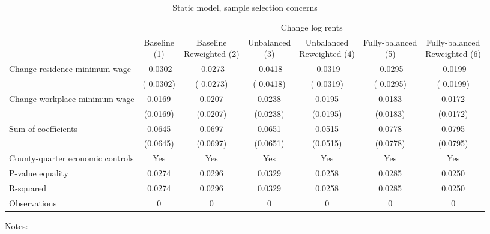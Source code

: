 \begin{table}
    \caption{Static model, sample selection concerns}
    \label{tab:static_sample}

    \begin{tabular}{@{}lcccccc@{}}
        \toprule
                                             & \multicolumn{6}{c}{Change log rents}                                     \\ \cmidrule(l){2-7} 
                                             & \shortstack{Baseline\\(1)}       & \shortstack{Baseline\\Reweighted (2)}
                                             & \shortstack{Unbalanced\\(3)}     & \shortstack{Unbalanced\\Reweighted (4)}
                                             & \shortstack{Fully-balanced\\(5)} & \shortstack{Fully-balanced\\Reweighted (6)}  \\ \midrule
        Change residence minimum wage        & -0.0302      & -0.0273        & -0.0418       & -0.0319      & -0.0295     & -0.0199            \\
                                             & (-0.0302)    & (-0.0273)      & (-0.0418)     & (-0.0319)    & (-0.0295)   & (-0.0199)          \\
        Change workplace minimum wage        & 0.0169      & 0.0207        & 0.0238       & 0.0195      & 0.0183     & 0.0172            \\
                                             & (0.0169)    & (0.0207)      & (0.0238)     & (0.0195)    & (0.0183)   & (0.0172)          \\ \midrule
        Sum of coefficients                  & 0.0645      & 0.0697        & 0.0651       & 0.0515      & 0.0778     &  0.0795           \\
                                             & (0.0645)    & (0.0697)      & (0.0651)     & (0.0515)    & (0.0778)   & (0.0795)          \\ \midrule
        County-quarter economic controls          & Yes      & Yes        & Yes       & Yes      & Yes     & Yes            \\
        P-value equality                     & 0.0274      & 0.0296        & 0.0329       & 0.0258      & 0.0285     & 0.0250            \\
        R-squared                            & 0.0274      & 0.0296        & 0.0329       & 0.0258      & 0.0285     & 0.0250            \\
        Observations                         & 0     & 0       & 0      & 0     & 0    & 0           \\ \bottomrule
    \end{tabular}

    \begin{minipage}{.95\textwidth} \footnotesize
        \vspace{2mm}
        Notes: 
    \end{minipage}
\end{table}
